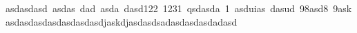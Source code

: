 \documentclass[12pt,
              ]{article}
\begin{document}
\mbox{asdasdasd asdas dad asda dasd122 1231 qsdasda  1 asduias dasud 98asd8 9askasdasdasdasdasdasdasdjaskdjasdasdsadasdasdasdadasd }
\end{document}
